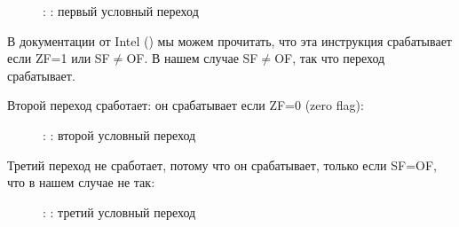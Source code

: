 \begin{figure}[H]
\centering
{}
\caption{\olly: : первый условный переход}
\label{fig:jcc_olly_signed_1}
\end{figure}

В документации от Intel () мы можем прочитать, что эта инструкция срабатывает если ZF=1 или SF$\neq$OF.
В нашем случае SF$\neq$OF, так что переход срабатывает.

\clearpage
Второй переход \JNZ сработает: он срабатывает если ZF=0 (zero flag):

\begin{figure}[H]
\centering
{}
\caption{\olly: : второй условный переход}
\label{fig:jcc_olly_signed_2}
\end{figure}

\clearpage
Третий переход \JGE не сработает, потому что он срабатывает, только если SF=OF, что в нашем случае не так:

\begin{figure}[H]
\centering
{}
\caption{\olly: : третий условный переход}
\label{fig:jcc_olly_signed_3}
\end{figure}
